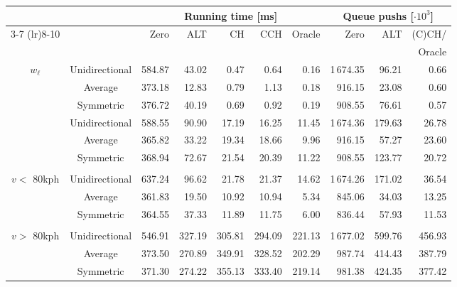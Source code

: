 \begin{tabular}{ccrrrrrrrr}
\toprule
 &  & \multicolumn{5}{c}{Running time [ms]} & \multicolumn{3}{c}{Queue pushs [$\cdot 10^3$]} \\ \cmidrule(lr){3-7} \cmidrule(lr){8-10}\multirow{2}{*}{$w_q$} & & \multirow{2}{*}{Zero} & \multirow{2}{*}{ALT} & \multirow{2}{*}{CH} & \multirow{2}{*}{CCH} & \multirow{2}{*}{Oracle} & \multirow{2}{*}{Zero} & \multirow{2}{*}{ALT} & (C)CH/ \\
 & & & & & & & & & Oracle \\
\midrule
\multirow{3}{*}{$w_{\ell}$} & Unidirectional &            584.87 &  43.02 &   0.47 &   0.64 &   0.16 &                    1\,674.35 &  96.21 &         0.66 \\
        & Average &            373.18 &  12.83 &   0.79 &   1.13 &   0.18 &                     916.15 &  23.08 &         0.60 \\
        & Symmetric &            376.72 &  40.19 &   0.69 &   0.92 &   0.19 &                     908.55 &  76.61 &         0.57 \\
\addlinespace
\multirow{3}{*}{$w_{\ell} \cdot 1.05$} & Unidirectional &            588.55 &  90.90 &  17.19 &  16.25 &  11.45 &                    1\,674.36 & 179.63 &        26.78 \\
        & Average &            365.82 &  33.22 &  19.34 &  18.66 &   9.96 &                     916.15 &  57.27 &        23.60 \\
        & Symmetric &            368.94 &  72.67 &  21.54 &  20.39 &  11.22 &                     908.55 & 123.77 &        20.72 \\
\addlinespace
\multirow{3}{*}{\shortstack{$w_{\ell} \cdot 1.5$ if\\ $v <$ 80kph}} & Unidirectional &            637.24 &  96.62 &  21.78 &  21.37 &  14.62 &                    1\,674.26 & 171.02 &        36.54 \\
        & Average &            361.83 &  19.50 &  10.92 &  10.94 &   5.34 &                     845.06 &  34.03 &        13.25 \\
        & Symmetric &            364.55 &  37.33 &  11.89 &  11.75 &   6.00 &                     836.44 &  57.93 &        11.53 \\
\addlinespace
\multirow{3}{*}{\shortstack{$w_{\ell} \cdot 1.5$ if\\ $v >$ 80kph}} & Unidirectional &            546.91 & 327.19 & 305.81 & 294.09 & 221.13 &                    1\,677.02 & 599.76 &       456.93 \\
        & Average &            373.50 & 270.89 & 349.91 & 328.52 & 202.29 &                     987.74 & 414.43 &       387.79 \\
        & Symmetric &            371.30 & 274.22 & 355.13 & 333.40 & 219.14 &                     981.38 & 424.35 &       377.42 \\
\bottomrule
\end{tabular}
